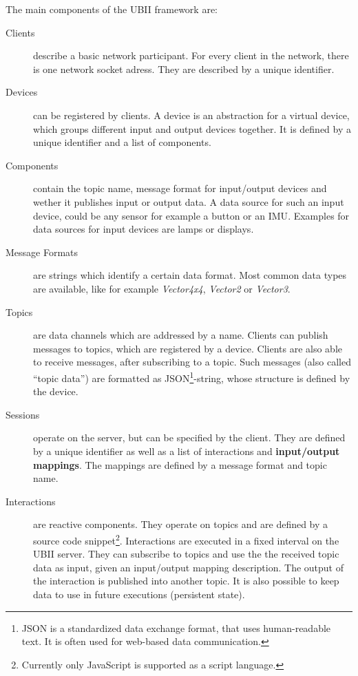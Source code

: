 The main components of the \ac{UBII} framework are:
\begin{description}
	\item[Clients] describe a basic network participant. For every client in the network, there is one network socket adress. They are described by a unique identifier. 
	\item[Devices] can be registered by clients. A device is an abstraction for a virtual device, which groups different input and output devices together. It is defined by a unique identifier and a list of components.
  \item[Components] contain the topic name, message format for input/output devices and wether it publishes input or output data. A data source for such an input device, could be any sensor for example a button or an \ac{IMU}. Examples for data sources for input devices are lamps or displays.
  \item[Message Formats] are strings which identify a certain data format. Most common data types are available, like for example \textit{Vector4x4}, \textit{Vector2} or \textit{Vector3}.
	\item[Topics] are data channels which are addressed by a name. Clients can publish messages to topics, which are registered by a device. Clients are also able to receive messages, after subscribing to a topic. Such messages (also called \enquote{topic data}) are formatted as JSON\footnote{JSON is a standardized data exchange format, that uses human-readable text. It is often used for web-based data communication.}-string, whose structure is defined by the device.
	\item[Sessions] operate on the server, but can be specified by the client. They are defined by a unique identifier as well as a list of interactions and \textbf{input/output mappings}. The mappings are defined by a message format and topic name.
	\item[Interactions] are reactive components. They operate on topics and are defined by a source code snippet\footnote{Currently only JavaScript is supported as a script language.}. Interactions are executed in a fixed interval on the \ac{UBII} server. They can subscribe to topics and use the the received topic data as input, given an input/output mapping description. The output of the interaction is published into another topic. It is also possible to keep data to use in future executions (persistent state).
\end{description}



